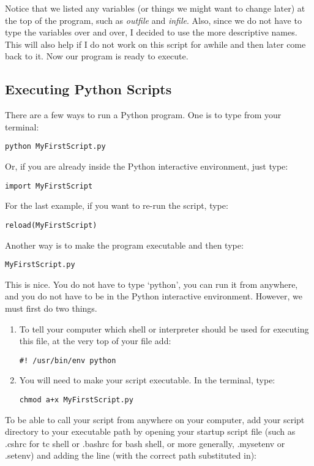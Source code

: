 Notice that we listed any variables (or things we might want to change
later) at the top of the program, such as \textit{outfile} and \textit{infile}.
Also, since we do not have to type the variables over and over, I
decided to use the more descriptive names.  This will also help if I
do not work on this script for awhile and then later come back to it.
Now our program is ready to execute.

\subsection{Executing Python Scripts}

There are a few ways to run a Python program.  One is to type from your terminal:

\texttt{\termtab python MyFirstScript.py}

Or, if you are already inside the Python interactive environment, just
type:

\texttt{\pytab import MyFirstScript}

For the last example, if you want to re-run the script, type:

\texttt{\pytab reload(MyFirstScript)}

Another way is to make the program executable and then type:

\texttt{\termtab MyFirstScript.py}

This is nice.  You do not have to type `python', you can run it from
anywhere, and you do not have to be in the Python interactive
environment.  However, we must first do two things.
\begin{enumerate}
\item To tell your computer which shell or interpreter should be used
  for executing this file, at the very top of your file add:

  \texttt{\#! /usr/bin/env python}

\item You will need to make your script executable.  In the terminal,
  type:

  \texttt{\termtab chmod a+x MyFirstScript.py}  
\end{enumerate}

To be able to call your script from anywhere on your computer, add
your script directory to your executable path by opening your startup 
script file (such as .cshrc for tc shell or .bashrc for bash shell, or more 
generally, .mysetenv or .setenv) and adding the line (with the correct 
path substituted in):


